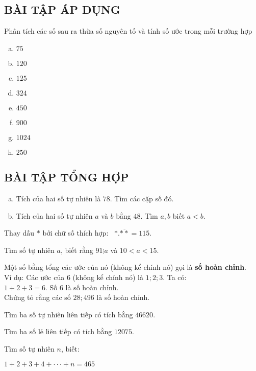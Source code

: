\subsection{BÀI TẬP ÁP DỤNG}
\begin{bt}
Phân tích các số sau ra thừa số nguyên tố và tính số ước trong mỗi trường hợp
\begin{multicols}{2}
\begin{enumerate}[a)]
\item $75$
\item $120$
\item $125$
\item $324$
\item $450$
\item $900$
\item $1024$
\item $250$
\end{enumerate}
\end{multicols}
\subsection{BÀI TẬP TỔNG HỢP}
\end{bt}   \begin{bt}
\begin{enumerate}[a)]
\item Tích của hai số tự nhiên là $78$. Tìm các cặp số đó.
\item Tích của hai số tự nhiên $a$ và $b$ bằng $48$. Tìm $a,b$ biết $a < b$.
\end{enumerate}
\end{bt}   \begin{bt}
Thay dấu $*$ bởi chữ số thích hợp: \, $*.\overline {**}  = 115$.
\end{bt}   \begin{bt}
Tìm số tự nhiên $a$, biết rằng $91 \vdots a$ và $10 < a < 15$.
\end{bt}   \begin{bt}
Một số bằng tổng các ước của nó (không kể chính nó) gọi là \textbf{số hoàn chỉnh}.\\
Ví dụ: Các ước của $6$ (không kể chính nó) là $1; 2; 3$. Ta có:\\ $1 + 2 + 3 = 6$. Số $6$ là số hoàn chỉnh.\\
Chứng tỏ rằng các số $28; 496$ là số hoàn chỉnh.
\end{bt}   \begin{bt}
Tìm ba số tự nhiên liên tiếp có tích bằng $46620$.
\end{bt}   \begin{bt}
Tìm ba số lẻ liên tiếp có tích bằng $12075$.
\end{bt}   \begin{bt}
Tìm số tự nhiên $n$, biết:
\begin{center}
$1 + 2 + 3 + 4 + \cdot \cdot \cdot + n = 465$
\end{center}
\end{bt}